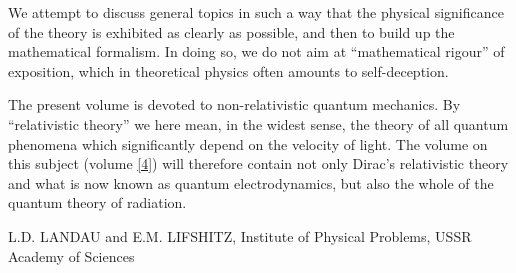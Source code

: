 We attempt to discuss general topics in such a way that the physical significance of the theory is exhibited as clearly as possible, and then to build up the mathematical formalism. In doing so, we do not aim at “mathematical rigour” of exposition, which in theoretical physics often amounts to self-deception.

The present volume is devoted to non-relativistic quantum mechanics. By “relativistic theory” we here mean, in the widest sense, the theory of all quantum phenomena which significantly depend on the velocity of light. The volume on this subject (volume \ref{4}) will therefore contain not only Dirac’s relativistic theory and what is now known as quantum electrodynamics, but also the whole of the quantum theory of radiation.


\vspace{4ex}
\noindent L.D. LANDAU and E.M. LIFSHITZ, Institute of Physical Problems, USSR Academy of Sciences



\noindent\date{August 1956}